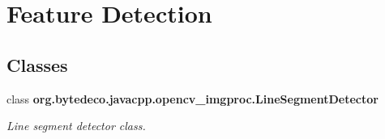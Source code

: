 \hypertarget{group__imgproc__feature}{}\section{Feature Detection}
\label{group__imgproc__feature}
\subsection*{Classes}
\begin{DoxyCompactItemize}
\item 
class {\bfseries org.\+bytedeco.\+javacpp.\+opencv\+\_\+imgproc.\+Line\+Segment\+Detector}
\begin{DoxyCompactList}\small\item\em Line segment detector class. \end{DoxyCompactList}\end{DoxyCompactItemize}
